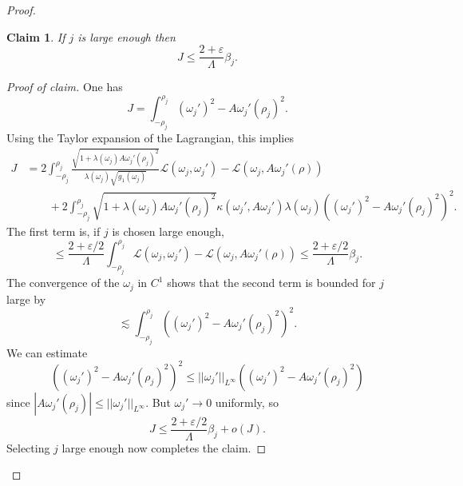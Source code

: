 \documentclass[reqno,12pt,letterpaper]{amsart}
\newcommand{\Lagrange}{\mathscr L}
\newtheorem{claim}[theorem]{Claim}
\theoremstyle{definition}
\numberwithin{equation}{section}
\begin{document}
\begin{proof}
\begin{claim}
If $j$ is large enough then
$$J \leq \frac{2 + \varepsilon}{\Lambda}\beta_j.$$
\end{claim}
\begin{proof}[Proof of claim]
One has
$$J = \int_{-\rho_j}^{\rho_j} (\omega_j')^2 - A \omega_j'(\rho_j)^2.$$
Using the Taylor expansion of the Lagrangian, this implies
\begin{align*}
J &= 2 \int_{-\rho_j}^{\rho_j} \frac{\sqrt{1 + \lambda(\omega_j) A \omega_j'(\rho_j)^2}}{\lambda(\omega_j) \sqrt{g_1(\omega_j)}}\mathscr L(\omega_j, \omega_j') - \mathscr L(\omega_j, A \omega_j'(\rho))\\
&\qquad + 2 \int_{-\rho_j}^{\rho_j} \sqrt{1 + \lambda(\omega_j) A \omega_j'(\rho_j)^2}\kappa(\omega_j', A\omega_j') \lambda(\omega_j) ((\omega_j')^2 - A\omega_j'(\rho_j)^2)^2.
\end{align*}
The first term is, if $j$ is chosen large enough,
$$\leq \frac{2 + \varepsilon/2}{\Lambda} \int_{-\rho_j}^{\rho_j} \Lagrange(\omega_j, \omega_j') - \Lagrange(\omega_j, A \omega_j'(\rho)) \leq \frac{2 + \varepsilon/2}{\Lambda} \beta_j.$$
The convergence of the $\omega_j$ in $C^1$ shows that the second term is bounded for $j$ large by
$$\lesssim \int_{-\rho_j}^{\rho_j} ((\omega_j')^2 - A\omega_j'(\rho_j)^2)^2.$$
We can estimate
$$((\omega_j')^2 - A\omega_j'(\rho_j)^2)^2 \leq ||\omega_j'||_{L^\infty} ((\omega_j')^2 - A \omega_j'(\rho_j)^2)$$
since $|A \omega_j'(\rho_j)| \leq ||\omega_j'||_{L^\infty}$.
But $\omega_j' \to 0$ uniformly, so
$$J \leq \frac{2 + \varepsilon/2}{\Lambda} \beta_j + o(J).$$
Selecting $j$ large enough now completes the claim.
\end{proof}


\end{proof}
\end{document}
